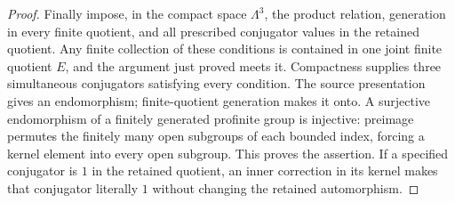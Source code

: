 \begin{proof}
Finally impose, in the compact space $\Lambda^3$, the product
relation, generation in every finite quotient, and all prescribed
conjugator values in the retained quotient. Any finite collection
of these conditions is contained in one joint finite quotient
$E$, and the argument just proved meets it. Compactness supplies
three simultaneous conjugators satisfying every condition.
The source presentation gives an endomorphism; finite-quotient
generation makes it onto. A surjective endomorphism of a finitely
generated profinite group is injective: preimage permutes the
finitely many open subgroups of each bounded index, forcing a
kernel element into every open subgroup. This proves the assertion.
If a specified conjugator is $1$ in the retained quotient, an
inner correction in its kernel makes that conjugator literally $1$
without changing the retained automorphism.
\end{proof}

